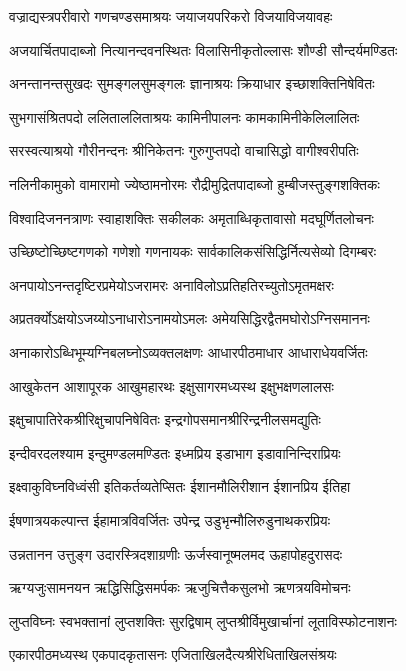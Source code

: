 \twolineshloka
{वज्राद्यस्त्रपरीवारो गणचण्डसमाश्रयः}
{जयाजयपरिकरो विजयाविजयावहः}

\twolineshloka
{अजयार्चितपादाब्जो नित्यानन्दवनस्थितः}
{विलासिनीकृतोल्लासः शौण्डी सौन्दर्यमण्डितः}

\twolineshloka
{अनन्तानन्तसुखदः सुमङ्गलसुमङ्गलः}
{ज्ञानाश्रयः क्रियाधार इच्छाशक्तिनिषेवितः}

\twolineshloka
{सुभगासंश्रितपदो ललिताललिताश्रयः}
{कामिनीपालनः कामकामिनीकेलिलालितः}

\twolineshloka
{सरस्वत्याश्रयो गौरीनन्दनः श्रीनिकेतनः}
{गुरुगुप्तपदो वाचासिद्धो वागीश्वरीपतिः}

\twolineshloka
{नलिनीकामुको वामारामो ज्येष्ठामनोरमः}
{रौद्रीमुद्रितपादाब्जो हुम्बीजस्तुङ्गशक्तिकः}

\twolineshloka
{विश्वादिजननत्राणः स्वाहाशक्तिः सकीलकः}
{अमृताब्धिकृतावासो मदघूर्णितलोचनः}

\twolineshloka
{उच्छिष्टोच्छिष्टगणको गणेशो गणनायकः}
{सार्वकालिकसंसिद्धिर्नित्यसेव्यो दिगम्बरः}

\twolineshloka
{अनपायोऽनन्तदृष्टिरप्रमेयोऽजरामरः}
{अनाविलोऽप्रतिहतिरच्युतोऽमृतमक्षरः}

\twolineshloka
{अप्रतर्क्योऽक्षयोऽजय्योऽनाधारोऽनामयोऽमलः}
{अमेयसिद्धिरद्वैतमघोरोऽग्निसमाननः}

\twolineshloka
{अनाकारोऽब्धिभूम्यग्निबलघ्नोऽव्यक्तलक्षणः}
{आधारपीठमाधार आधाराधेयवर्जितः}

\twolineshloka
{आखुकेतन आशापूरक आखुमहारथः}
{इक्षुसागरमध्यस्थ इक्षुभक्षणलालसः}

\twolineshloka
{इक्षुचापातिरेकश्रीरिक्षुचापनिषेवितः}
{इन्द्रगोपसमानश्रीरिन्द्रनीलसमद्युतिः}

\twolineshloka
{इन्दीवरदलश्याम इन्दुमण्डलमण्डितः}
{इध्मप्रिय इडाभाग इडावानिन्दिराप्रियः}

\twolineshloka
{इक्ष्वाकुविघ्नविध्वंसी इतिकर्तव्यतेप्सितः}
{ईशानमौलिरीशान ईशानप्रिय ईतिहा}

\twolineshloka
{ईषणात्रयकल्पान्त ईहामात्रविवर्जितः}
{उपेन्द्र उडुभृन्मौलिरुडुनाथकरप्रियः}

\twolineshloka
{उन्नतानन उत्तुङ्ग उदारस्त्रिदशाग्रणीः}
{ऊर्जस्वानूष्मलमद ऊहापोहदुरासदः}

\twolineshloka
{ऋग्यजुःसामनयन ऋद्धिसिद्धिसमर्पकः}
{ऋजुचित्तैकसुलभो ऋणत्रयविमोचनः}

\twolineshloka
{लुप्तविघ्नः स्वभक्तानां लुप्तशक्तिः सुरद्विषाम्}
{लुप्तश्रीर्विमुखार्चानां लूताविस्फोटनाशनः}

\twolineshloka
{एकारपीठमध्यस्थ एकपादकृतासनः}
{एजिताखिलदैत्यश्रीरेधिताखिलसंश्रयः}

